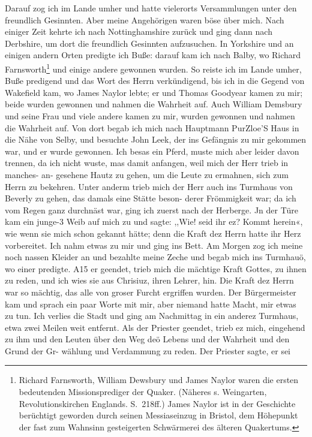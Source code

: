 Darauf zog ich im Lande umher und hatte vielerorts 
Versammlungen unter den freundlich Gesinnten. Aber meine 
Angehörigen waren böse über mich. 
Nach einiger Zeit kehrte ich nach
Nottinghamshire zurück und ging 
dann nach Derbshire, um dort
die freundlich Gesinnten aufzusuchen. In 
Yorkshire und an einigen
andern Orten predigte ich Buße: darauf kam ich nach Balby,
wo Richard 
Farnsworth\footnote{Richard 
Farnsworth, William Dewsbury und James Naylor waren
die ersten bedeutenden Missionsprediger der Quaker. 
(Näheres s. Weingarten, Revolutionskirchen 
Englands. S.~218ff.) James Naylor ist in der Geschichte
berüchtigt geworden durch seinen Messiaseinzug in Bristol, 
dem Höhepunkt der fast zum Wahnsinn gesteigerten 
Schwärmerei des älteren Quakertums.} und einige 
andere gewonnen wurden.
So reiste ich im Lande umher, Buße 
predigend und das Wort
des Herrn verkündigend, bis ich in die Gegend von 
Wakefield
kam, wo James Naylor lebte; 
er und Thomas Goodyear
kamen zu mir; beide wurden gewonnen und nahmen die Wahrheit
auf. Auch William Demsbury 
und seine Frau und viele andere
kamen zu mir, wurden gewonnen und nahmen die Wahrheit auf.
Von dort begab ich mich nach Hauptmann PurZloe’S Haus in
die Nähe von Selby, und besuchte John Leek, der ins Gefängnis
zu mir gekommen war, und er wurde gewonnen. Ich besas ein
Pferd, muste mich aber leider davon trennen, da ich nicht wuste,
mas damit anfangen, weil mich der Herr trieb in manches- an-
gesehene Hautz zu gehen, um die Leute zu ermahnen, sich zum
Herrn zu bekehren. Unter anderm trieb mich der Herr auch ins
Turmhaus von Beverly zu gehen, das damals eine Stätte beson-
derer Frömmigkeit war; da ich vom Regen ganz durchnäst war,
ging ich zuerst nach der Herberge. Jn der Türe kam ein junge-3
Weib auf mich zu und sagte: ,,Wie! seid ihr ez? Kommt herein«,
wie wenn sie mich schon gekannt hätte; denn die Kraft dez Herrn
hatte ihr Herz vorbereitet. Ich nahm etwas zu mir und ging
ins Bett. Am Morgen zog ich meine noch nassen Kleider an
und bezahlte meine Zeche und begab mich ins Turmhauö, wo
einer predigte. A15 er geendet, trieb mich die mächtige Kraft Gottes,
zu ihnen zu reden, und ich wies sie aus Chrisiuz, ihren Lehrer, hin.
Die Kraft dez Herrn war so mächtig, das alle von groser Furcht
ergriffen wurden. Der Bürgermeister kam und sprach ein paar
Worte mit mir, aber niemand hatte Macht, mir etwas zu tun.
Ich verlies die Stadt und ging am Nachmittag in ein anderez
Turmhaus, etwa zwei Meilen weit entfernt. Als der Priester
geendet, trieb ez mich, eingehend zu ihm und den Leuten über
den Weg deö Lebens und der Wahrheit und den Grund der Gr-
wählung und Verdammung zu reden. Der Priester sagte, er sei



